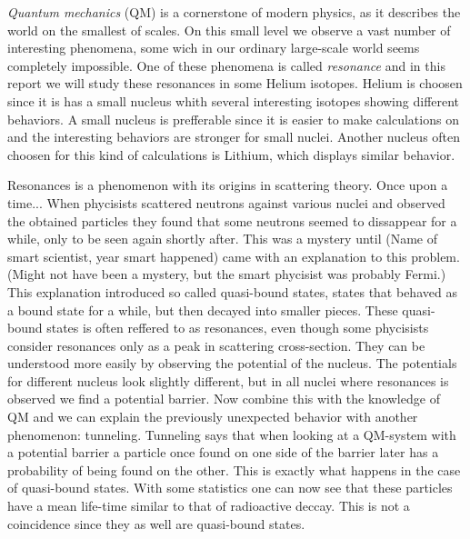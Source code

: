 \emph{Quantum mechanics} (QM) is a cornerstone of modern physics, as it describes the world on the smallest of scales.
On this small level we observe a vast number of interesting phenomena, some wich in our ordinary large-scale world seems completely impossible.
One of these phenomena is called \emph{resonance} and in this report we will study these resonances in some Helium isotopes. 
Helium is choosen since it is has a small nucleus whith several interesting isotopes showing different behaviors.
A small nucleus is prefferable since it is easier to make calculations on and the interesting behaviors are stronger for small nuclei.
Another nucleus often choosen for this kind of calculations is Lithium, which displays similar behavior.

Resonances is a phenomenon with its origins in scattering theory.
Once upon a time... When phycisists scattered neutrons against various nuclei and observed the obtained particles they found that some neutrons seemed to dissappear for a while, only to be seen again shortly after.
This was a mystery until (Name of smart scientist, year smart happened) came with an explanation to this problem. (Might not have been a mystery, but the smart phycisist was probably Fermi.)
This explanation introduced so called quasi-bound states, states that behaved as a bound state for a while, but then decayed into smaller pieces.
These quasi-bound states is often reffered to as resonances, even though some phycisists consider resonances only as a peak in scattering cross-section.
They can be understood more easily by observing the potential of the nucleus.
The potentials for different nucleus look slightly different, but in all nuclei where resonances is observed we find a potential barrier.
Now combine this with the knowledge of QM and we can explain the previously unexpected behavior with another phenomenon: tunneling.
Tunneling says that when looking at a QM-system with a potential barrier a particle once found on one side of the barrier later has a probability of being found on the other.
This is exactly what happens in the case of quasi-bound states.
With some statistics one can now see that these particles have a mean life-time similar to that of radioactive deccay.
This is not a coincidence since they as well are quasi-bound states.



